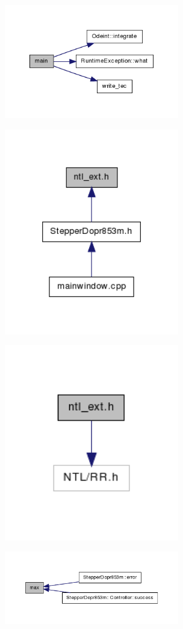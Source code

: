 \includegraphics[width=3in]{figures/mainwindow_8cpp_a0ddf1224851353fc92bfbff6f499fa97_cgraph.png}

\includegraphics[width=3in]{figures/ntl__ext_8h__dep__incl.png}

\includegraphics[width=3in]{figures/ntl__ext_8h__incl.png}

\includegraphics[width=3in]{figures/ntl__ext_8h_a8e2d6730b8d184fccdf23ef92b230729_icgraph.png}

